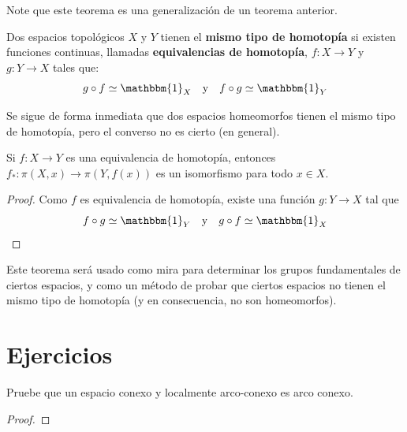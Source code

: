 \documentclass[12pt]{report}
\theoremstyle{largebreak}
\newcommand\cf[3]{\ensuremath{#1:#2\rightarrow#3}}
\newcommand{\bbm}[1]{\ensuremath{\mathbbm{#1}}}
\begin{document}
    Note que este teorema es una generalización de un teorema anterior. 

    \begin{mydef}
        Dos espacios topológicos $X$ y $Y$ tienen el \textbf{mismo tipo de homotopía} si existen funciones continuas, llamadas \textbf{equivalencias de homotopía}, $\cf{f}{X}{Y}$ y $\cf{g}{Y}{X}$ tales que:
        \begin{equation*}
            g\circ f\simeq\bbm{1}_X\quad\textup{y}\quad f\circ g\simeq\bbm{1}_Y
        \end{equation*}
    \end{mydef}

    Se sigue de forma inmediata que dos espacios homeomorfos tienen el mismo tipo de homotopía, pero el converso no es cierto (en general).

    \begin{theor}
        Si $\cf{f}{X}{Y}$ es una equivalencia de homotopía, entonces $\cf{f_*}{\pi(X,x)}{\pi(Y,f(x))}$ es un isomorfismo para todo $x\in X$.
    \end{theor}

    \begin{proof}
        Como $f$ es equivalencia de homotopía, existe una función $\cf{g}{Y}{X}$ tal que
        \begin{equation*}
            f\circ g\simeq\bbm{1}_Y\quad\textup{y}\quad g\circ f\simeq\bbm{1}_X
        \end{equation*}
    \end{proof}

    Este teorema será usado como mira para determinar los grupos fundamentales de ciertos espacios, y como un método de probar que ciertos espacios no tienen el mismo tipo de homotopía (y en consecuencia, no son homeomorfos).

    \newpage

    \section{Ejercicios}

    \begin{excer}
        Pruebe que un espacio conexo y localmente arco-conexo es arco conexo.
    \end{excer}

    \begin{proof}
        
    \end{proof}
\end{document}
